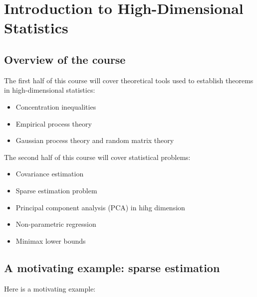 
\section{Introduction to High-Dimensional Statistics}

\subsection{Overview of the course}

The first half of this course will cover theoretical tools used to establish theorems in high-dimensional statistics:
\begin{itemize}
\item Concentration inequalities

\item Empirical process theory

\item Gaussian process theory and random matrix theory
\end{itemize}
The second half of this course will cover statistical problems:
\begin{itemize}
\item Covariance estimation

\item Sparse estimation problem

\item Principal component analysis (PCA) in hihg dimension

\item Non-parametric regression

\item Minimax lower bounds
\end{itemize}

\subsection{A motivating example: sparse estimation}

Here is a motivating example:

